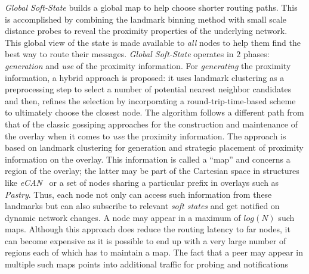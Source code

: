 
\emph{Global Soft-State} \cite{XTZ2003} builds a global map to help
choose shorter routing paths. This is accomplished by 
combining the landmark binning method with small
scale distance probes to reveal the proximity properties 
of the underlying network. 
This global view of the state is made available to 
\emph{all} nodes to help them find the best way to route their messages. 
\emph{Global Soft-State} operates in $2$ phases:
\emph{generation} and \emph{use} of the proximity information. 
For \emph{generating} the proximity information, 
a hybrid approach is proposed: it uses landmark clustering as a
preprocessing step to select a number of potential nearest neighbor
candidates and then, refines the selection by incorporating a
round-trip-time-based scheme to ultimately choose the closest node. 
The algorithm follows a different path from that of the
classic gossiping approaches for the construction and 
maintenance of the overlay when 
it comes to \emph{use} the proximity information.
The approach is based on landmark clustering 
for generation and strategic
placement of proximity information on the overlay. 
This information is called a ``map'' and concerns a 
region of the overlay; 
the latter may be part of the Cartesian space in
structures like \emph{eCAN}~\cite{xu_ecan_2002} or 
a set of nodes sharing a particular
prefix in overlays such as \emph{Pastry}\cite{antony_pastry_2001}. 
Thus, each node not only can access such information from 
these landmarks but can also subscribe to
relevant \emph{soft states} and get notified on dynamic network changes. 
A node may appear in a maximum of $log(N)$ such maps.
Although this approach does reduce the routing latency to far nodes, it
can become expensive as it is 
possible to end up with a very large number of regions
each of which has to maintain a map. 
The fact that a peer may appear in multiple
such maps points into additional traffic for probing and notifications
